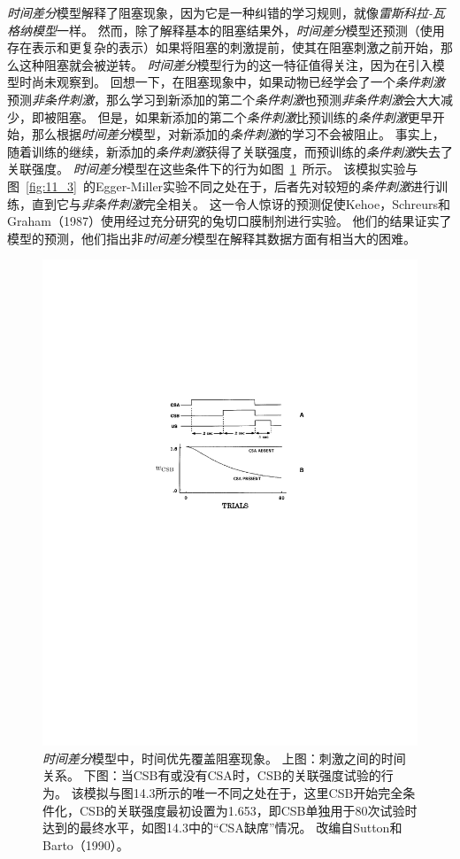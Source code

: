 \textit{时间差分}模型解释了阻塞现象，因为它是一种纠错的学习规则，就像\textit{雷斯科拉-瓦格纳模型}一样。
然而，除了解释基本的阻塞结果外，\textit{时间差分}模型还预测（使用存在表示和更复杂的表示）如果将阻塞的刺激提前，使其在阻塞刺激之前开始，那么这种阻塞就会被逆转。
\textit{时间差分}模型行为的这一特征值得关注，因为在引入模型时尚未观察到。
回想一下，在阻塞现象中，如果动物已经学会了一个\textit{条件刺激}预测\textit{非条件刺激}，那么学习到新添加的第二个\textit{条件刺激}也预测\textit{非条件刺激}会大大减少，即被阻塞。
但是，如果新添加的第二个\textit{条件刺激}比预训练的\textit{条件刺激}更早开始，那么根据\textit{时间差分}模型，对新添加的\textit{条件刺激}的学习不会被阻止。
事实上，随着训练的继续，新添加的\textit{条件刺激}获得了关联强度，而预训练的\textit{条件刺激}失去了关联强度。
\textit{时间差分}模型在这些条件下的行为如图~\ref{fig:11_4}~所示。
该模拟实验与图~\ref{fig:11_3}~的Egger-Miller实验不同之处在于，后者先对较短的\textit{条件刺激}进行训练，直到它与\textit{非条件刺激}完全相关。
这一令人惊讶的预测促使Kehoe，Schreurs和Graham（1987）使用经过充分研究的兔切口膜制剂进行实验。
他们的结果证实了模型的预测，他们指出非\textit{时间差分}模型在解释其数据方面有相当大的困难。


\begin{figure}[!htb]
	\centering
	\includegraphics[width=0.5\linewidth]{chap11/fig_11_4}
	\caption{\textit{时间差分}模型中，时间优先覆盖阻塞现象。
		上图：刺激之间的时间关系。
		下图：当CSB有或没有CSA时，CSB的关联强度试验的行为。
		该模拟与图14.3所示的唯一不同之处在于，这里CSB开始完全条件化，CSB的关联强度最初设置为1.653，即CSB单独用于80次试验时达到的最终水平，如图14.3中的“CSA缺席”情况。
		改编自Sutton和Barto（1990）。 \label{fig:11_4}}
\end{figure}


